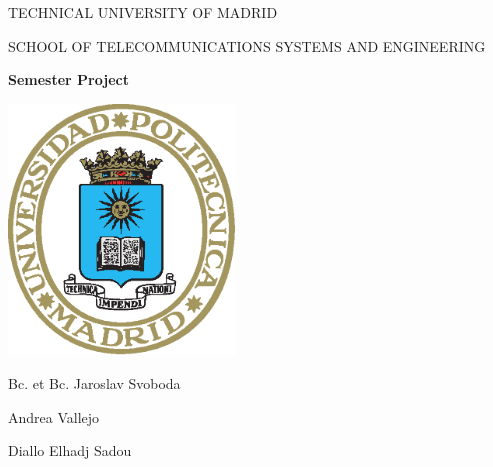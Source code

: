 \documentclass[UKenglish,10pt,a4paper]{report}
\begin{document}
\begin{titlepage}


\pagestyle{empty}
\begin{center}

\large

TECHNICAL UNIVERSITY OF MADRID

\medskip

SCHOOL OF TELECOMMUNICATIONS SYSTEMS AND ENGINEERING

\vfill

{\bf\Large Semester Project}

\vfill
\centerline{\mbox{\includegraphics[width=60mm]{img/logo2.eps}}}
			
\vfill
\vspace{5mm}

{\LARGE Bc. et Bc. Jaroslav Svoboda}

{\LARGE Andrea Vallejo}

{\LARGE Diallo Elhadj Sadou}


\end{center}
\end{titlepage}
\end{document}
